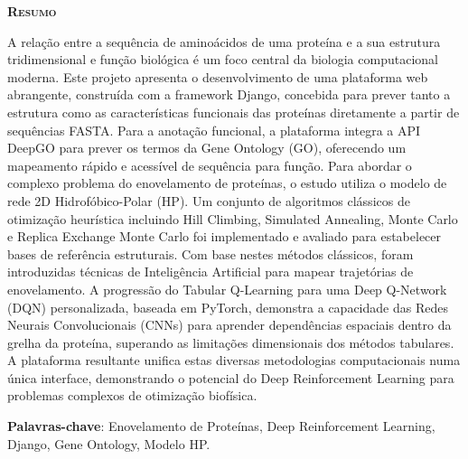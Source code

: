 \vspace*{45pt}
\begin{flushleft}
	{\Large \textbf{\scshape{Resumo}}}
\end{flushleft}
\vspace*{10pt}

A relação entre a sequência de aminoácidos de uma proteína e a sua estrutura tridimensional e função biológica é um foco central da biologia computacional moderna. Este projeto apresenta o desenvolvimento de uma plataforma web abrangente, construída com a framework Django, concebida para prever tanto a estrutura como as características funcionais das proteínas diretamente a partir de sequências FASTA. Para a anotação funcional, a plataforma integra a API DeepGO para prever os termos da Gene Ontology (GO), oferecendo um mapeamento rápido e acessível de sequência para função. Para abordar o complexo problema do enovelamento de proteínas, o estudo utiliza o modelo de rede 2D Hidrofóbico-Polar (HP). Um conjunto de algoritmos clássicos de otimização heurística incluindo Hill Climbing, Simulated Annealing, Monte Carlo e Replica Exchange Monte Carlo foi implementado e avaliado para estabelecer bases de referência estruturais. Com base nestes métodos clássicos, foram introduzidas técnicas de Inteligência Artificial para mapear trajetórias de enovelamento. A progressão do Tabular Q-Learning para uma Deep Q-Network (DQN) personalizada, baseada em PyTorch, demonstra a capacidade das Redes Neurais Convolucionais (CNNs) para aprender dependências espaciais dentro da grelha da proteína, superando as limitações dimensionais dos métodos tabulares. A plataforma resultante unifica estas diversas metodologias computacionais numa única interface, demonstrando o potencial do Deep Reinforcement Learning para problemas complexos de otimização biofísica.

\vspace*{20pt}

\noindent \textbf{Palavras-chave}:
Enovelamento de Proteínas, Deep Reinforcement Learning, Django, Gene Ontology, Modelo HP.
